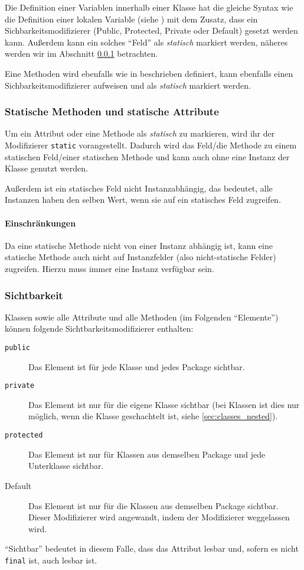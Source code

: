	Die Definition einer Variablen innerhalb einer Klasse hat die gleiche Syntax wie die Definition einer lokalen Variable (siehe ) mit dem Zusatz, dass ein Sichbarkeitsmodifizierer (Public, Protected, Private oder Default) gesetzt werden kann. Außerdem kann ein solches \enquote{Feld} als \textit{statisch} markiert werden, näheres werden wir im Abschnitt \ref{sec:static_fields} betrachten.
	
	Eine Methoden wird ebenfalls wie in  beschrieben definiert, kann ebenfalls einen Sichbarkeitsmodifizierer aufweisen und als \textit{statisch} markiert werden.
	
	\subsubsection{Statische Methoden und statische Attribute}
		\label{sec:static_fields}
		
		Um ein Attribut oder eine Methode als \textit{statisch} zu markieren, wird ihr der Modifizierer \lstinline|static| vorangestellt. Dadurch wird das Feld/die Methode zu einem statischen Feld/einer statischen Methode und kann auch ohne eine Instanz der Klasse genutzt werden.
		
		Außerdem ist ein statisches Feld nicht Instanzabhängig, das bedeutet, alle Instanzen haben den selben Wert, wenn sie auf ein statisches Feld zugreifen.
		
		\paragraph{Einschränkungen}
			Da eine statische Methode nicht von einer Instanz abhängig ist, kann eine statische Methode auch nicht auf Instanzfelder (also nicht-statische Felder) zugreifen. Hierzu muss immer eine Instanz verfügbar sein.
	
	\subsubsection{Sichtbarkeit}
		\label{sec:visibility}
	
		Klassen sowie alle Attribute und alle Methoden (im Folgenden \enquote{Elemente}) können folgende Sichtbarkeitsmodifizierer enthalten:
		\begin{description}
			\item[\lstinline|public|] Das Element ist für jede Klasse und jedes Package sichtbar.
			\item[\lstinline|private|] Das Element ist nur für die eigene Klasse sichtbar (bei Klassen ist dies nur möglich, wenn die Klasse geschachtelt ist, siehe \ref{sec:classes_nested}).
			\item[\lstinline|protected|] Das Element ist nur für Klassen aus demselben Package und jede Unterklasse sichtbar.
			\item[Default] Das Element ist nur für die Klassen aus demselben Package sichtbar. Dieser Modifizierer wird angewandt, indem der Modifizierer weggelassen wird.
		\end{description}
		\enquote{Sichtbar} bedeutet in diesem Falle, dass das Attribut lesbar und, sofern es nicht \lstinline|final| ist, auch lesbar ist.
	
